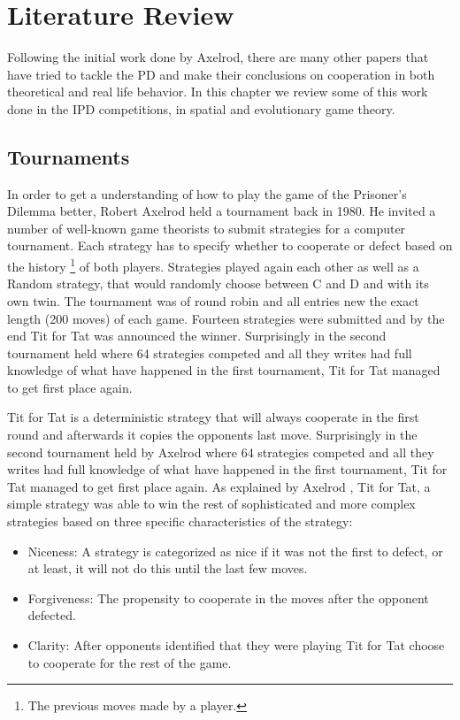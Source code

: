 \chapter{Literature Review}

Following the initial work done by Axelrod, there are many other papers that
have tried to tackle the PD and make their conclusions on cooperation in
both theoretical and real life behavior. In this chapter we review some of this
work done in the IPD competitions, in spatial and evolutionary game theory.

\section{Tournaments}

In order to get a understanding of how to play the game of the Prisoner's Dilemma
better, Robert Axelrod held a tournament back in 1980. He invited a number of
well-known game theorists to submit strategies for a computer tournament.
Each strategy has to specify whether to cooperate or defect based on the
history \footnote{The previous moves made by a player.} of both players.
Strategies played again each other as well as a Random strategy, that would
randomly choose between C and D and with its own twin. The tournament was of
round robin and all entries new the exact length (200 moves) of each game.
Fourteen strategies were submitted and by the end Tit for Tat was announced the
winner. Surprisingly in the second tournament held where 64 strategies
competed and all they writes had full knowledge of what have happened in the
first tournament, Tit for Tat managed to get first place again.\parencite{Axelrod1980a}

Tit for Tat is a deterministic strategy that will always cooperate in the first
round and afterwards it copies the opponents last move. Surprisingly in the
second tournament held by Axelrod \parencite{Axelrod1980a} where 64 strategies
competed and all they writes had full knowledge of what have happened in the
first tournament, Tit for Tat managed to get first place again.
As explained by Axelrod \parencite{Axelrod1980b}, Tit for Tat, a simple strategy was able to
win the rest of sophisticated and more complex strategies based on three specific
characteristics of the strategy:

\begin{itemize}
  \item Niceness:  A strategy is categorized as nice if it was not the
                    first to defect, or at least, it will not do this until
                    the last few moves.
  \item Forgiveness: The propensity to cooperate in the moves after the
                     opponent defected.
  \item Clarity: After opponents identified that they were playing Tit for Tat
                 choose to cooperate for the rest of the game.
\end{itemize}


